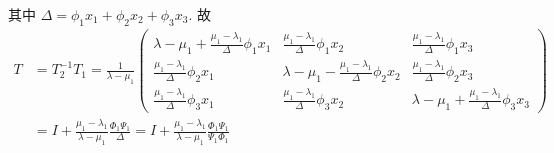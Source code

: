 其中 $ \Delta = \phi_{1}x_{1} + \phi_{2}x_{2} + \phi_{3}x_{3} $. 故 
\begin{equation*}
    \begin{aligned}
        T &= T_{2}^{-1}T_{1} = \frac{1}{\lambda - \mu_{1}}
        \begin{pmatrix}
            \lambda - \mu_{1} + \frac{\mu_{1}- \lambda_{1}}{\Delta}\phi_{1}x_{1} & \frac{\mu_{1}- \lambda_{1}}{\Delta}\phi_{1}x_{2} & \frac{\mu_{1}- \lambda_{1}}{\Delta}\phi_{1}x_{3} \\
            \frac{\mu_{1}- \lambda_{1}}{\Delta}\phi_{2}x_{1} & \lambda - \mu_{1} - \frac{\mu_{1}- \lambda_{1}}{\Delta}\phi_{2}x_{2} & \frac{\mu_{1}- \lambda_{1}}{\Delta}\phi_{2}x_{3} \\
            \frac{\mu_{1}- \lambda_{1}}{\Delta}\phi_{3}x_{1} & \frac{\mu_{1}- \lambda_{1}}{\Delta}\phi_{3}x_{2} & \lambda - \mu_{1} + \frac{\mu_{1}- \lambda_{1}}{\Delta}\phi_{3}x_{3}
        \end{pmatrix} \\
        &= I + \frac{\mu_{1} - \lambda_{1}}{\lambda - \mu_{1}} \frac{\Phi_{1}\Psi_{1}}{\Delta} = I + \frac{\mu_{1} - \lambda_{1}}{\lambda - \mu_{1}} \frac{\Phi_{1}\Psi_{1}}{\Psi_{1}\Phi_{1}}
    \end{aligned}
\end{equation*}